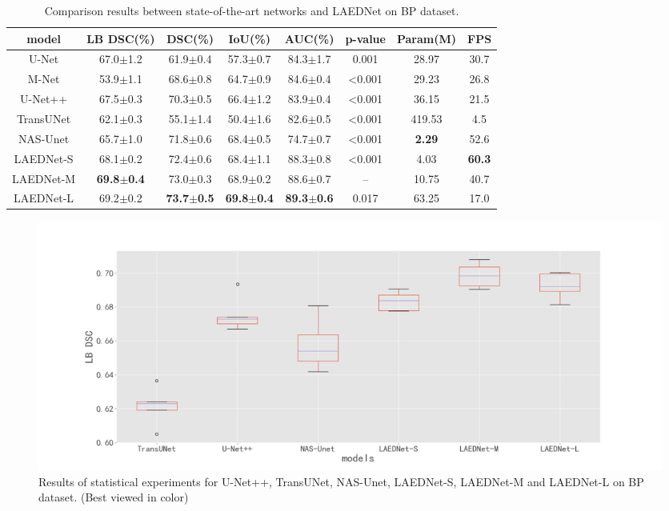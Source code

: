 \documentclass[review]{elsarticle}
\begin{document}
\begin{table}[!t]
	\caption{Comparison results between state-of-the-art networks and LAEDNet on BP \cite{Kaggle} dataset.}
	\centering
	\setlength{\tabcolsep}{1.8mm}
	\begin{tabular} {c|cccc|c|cc}
		\hline
		model & LB DSC(\%) & DSC(\%) & IoU(\%) & AUC(\%) &p-value & Param(M) & FPS \\
		\hline
		U-Net \cite{2015U} & 67.0$\pm$1.2 & 61.9$\pm$0.4 & 57.3$\pm$0.7 & 84.3$\pm$1.7 & 0.001 &  28.97 & 30.7 \\
		\hline
		M-Net \cite{2019Deep} &	53.9$\pm$1.1 & 68.6$\pm$0.8 & 64.7$\pm$0.9 & 84.6$\pm$0.4 & \textless0.001 &  29.23 & 26.8 \\
		\hline
		U-Net++ \cite{2020UNet} & 67.5$\pm$0.3 & 70.3$\pm$0.5 & 66.4$\pm$1.2 & 83.9$\pm$0.4 & \textless0.001 &  36.15 & 21.5 \\
		\hline
		TransUNet \cite{chen2021transunet} & 62.1$\pm$0.3 & 55.1$\pm$1.4 & 50.4$\pm$1.6 & 82.6$\pm$0.5 & \textless0.001 &  419.53 & 4.5 \\
		\hline
		NAS-Unet \cite{2019Nas-unet} & 65.7$\pm$1.0 & 71.8$\pm$0.6 & 68.4$\pm$0.5 & 74.7$\pm$0.7 & \textless0.001 &  \textbf{2.29} & 52.6 \\
		\hline
		LAEDNet-S & 68.1$\pm$0.2 & 72.4$\pm$0.6 & 68.4$\pm$1.1 & 88.3$\pm$0.8 & \textless0.001 &  4.03 & \textbf{60.3} \\
		\hline
		LAEDNet-M & \textbf{69.8$\pm$0.4} & 73.0$\pm$0.3 & 68.9$\pm$0.2 & 88.6$\pm$0.7 & -- &  10.75 & 40.7 \\
		\hline
		LAEDNet-L & 69.2$\pm$0.2 & \textbf{73.7$\pm$0.5} & \textbf{69.8$\pm$0.4} & \textbf{89.3$\pm$0.6} & 0.017 &  63.25 & 17.0 \\
		\hline
	\end{tabular}\label{table2}
\end{table}
\begin{figure}[!h]
	\includegraphics[width=1\linewidth]{boxplot-BP2.png}
	\centering
	\caption{Results of statistical experiments for U-Net++\cite{2020UNet}, TransUNet\cite{chen2021transunet}, NAS-Unet\cite{2019Nas-unet}, LAEDNet-S, LAEDNet-M and LAEDNet-L on BP\cite{Kaggle} dataset. (Best viewed in color)}
	\label{fig4}
\end{figure}
\end{document}
